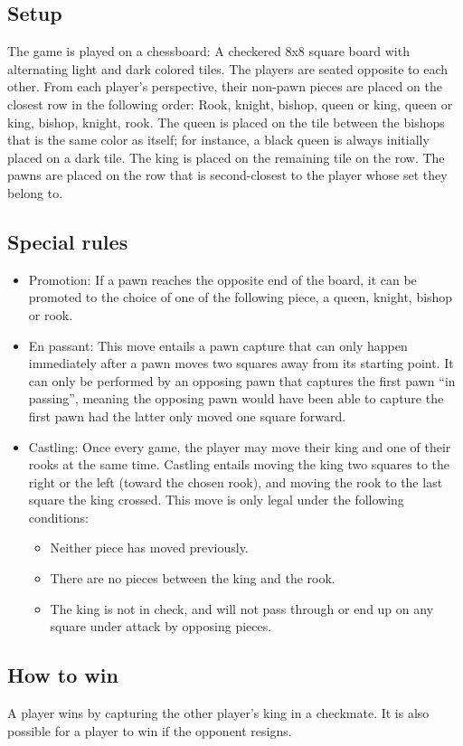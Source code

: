 \documentclass[12pt, a4paper]{article}
\begin{document}
\subsection{Setup}
The game is played on a chessboard: A checkered 8x8 square board with alternating light and dark colored tiles. The players are seated opposite to each other. From each player’s perspective, their non-pawn pieces are placed on the closest row in the following order: Rook, knight, bishop, queen or king, queen or king, bishop, knight, rook. The queen is placed on the tile between the bishops that is the same color as itself; for instance, a black queen is always initially placed on a dark tile. The king is placed on the remaining tile on the row. The pawns are placed on the row that is second-closest to the player whose set they belong to.

\subsection{Special rules}
\begin{itemize}
\item Promotion: If a pawn reaches the opposite end of the board, it can be promoted to the choice of one of the following piece, a queen, knight, bishop or rook.
\item En passant: This move entails a pawn capture that can only happen immediately after a pawn moves two squares away from its starting point. It can only be performed by an opposing pawn that captures the first pawn “in passing”, meaning the opposing pawn would have been able to capture the first pawn had the latter only moved one square forward.
\item Castling: Once every game, the player may move their king and one of their rooks at the same time. Castling entails moving the king two squares to the right or the left (toward the chosen rook), and moving the rook to the last square the king crossed. This move is only legal under the following conditions:	
\begin{itemize}
\item Neither piece has moved previously.
\item There are no pieces between the king and the rook.
\item The king is not in check, and will not pass through or end up on any square under attack by opposing pieces.
\end{itemize}
\end{itemize}

\subsection{How to win}
A player wins by capturing the other player’s king in a checkmate. It is also possible for a player to win if the opponent resigns.
\end{document}
